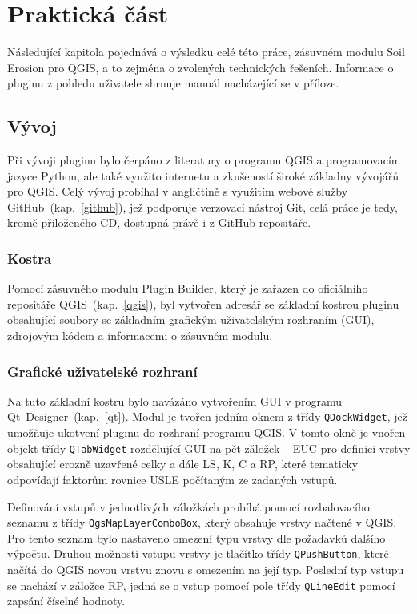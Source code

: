 \chapter{Praktická část}
\label{4-prakticka-cast}
Následující kapitola pojednává o výsledku celé této práce, zásuvném modulu Soil Erosion pro QGIS, a to zejména o zvolených technických řešeních. Informace o pluginu z pohledu uživatele shrnuje manuál nacházející se v příloze.
\section{Vývoj}
Při vývoji pluginu bylo čerpáno z literatury o programu QGIS\cite{masteringQgis} a programovacím jazyce Python\cite{learningPython}\cite{diveIntoPython}, ale také využito internetu a zkušeností široké základny vývojářů pro QGIS\cite{stackexchange}. Celý vývoj probíhal v angličtině s využitím webové služby GitHub~(kap.~\ref{github}), jež podporuje verzovací nástroj Git, celá práce je tedy, kromě přiloženého CD, dostupná právě i z GitHub repositáře\cite{mujgithub}.
\subsection{Kostra}
Pomocí zásuvného modulu Plugin Builder, který je zařazen do oficiálního repositáře QGIS~(kap.~\ref{qgis}), byl vytvořen adresář se základní kostrou pluginu obsahující soubory se základním grafickým uživatelským rozhraním (GUI), zdrojovým kódem a informacemi o zásuvném modulu.
\subsection{Grafické uživatelské rozhraní}
Na tuto základní kostru bylo navázáno vytvořením GUI v programu Qt~Designer~(kap.~\ref{qt}). Modul je tvořen jedním oknem z třídy \texttt{QDockWidget}, jež umožňuje ukotvení pluginu do rozhraní programu QGIS. V tomto okně je vnořen objekt třídy \texttt{QTabWidget} rozdělující GUI na pět záložek – EUC pro definici vrstvy obsahující erozně uzavřené celky a dále LS, K, C a RP, které tematicky odpovídají faktorům rovnice USLE počítaným ze zadaných vstupů. 

Definování vstupů v jednotlivých záložkách probíhá pomocí rozbalovacího seznamu z třídy \texttt{QgsMapLayerComboBox}, který obsahuje vrstvy načtené v QGIS. Pro tento seznam bylo nastaveno omezení typu vrstvy dle požadavků dalšího výpočtu.  Druhou možností vstupu vrstvy je tlačítko třídy \texttt{QPushButton}, které načítá do QGIS novou vrstvu znovu s omezením na její typ. Poslední typ vstupu se nachází v záložce RP, jedná se o vstup pomocí pole třídy \texttt{QLineEdit} pomocí zapsání číselné hodnoty.

